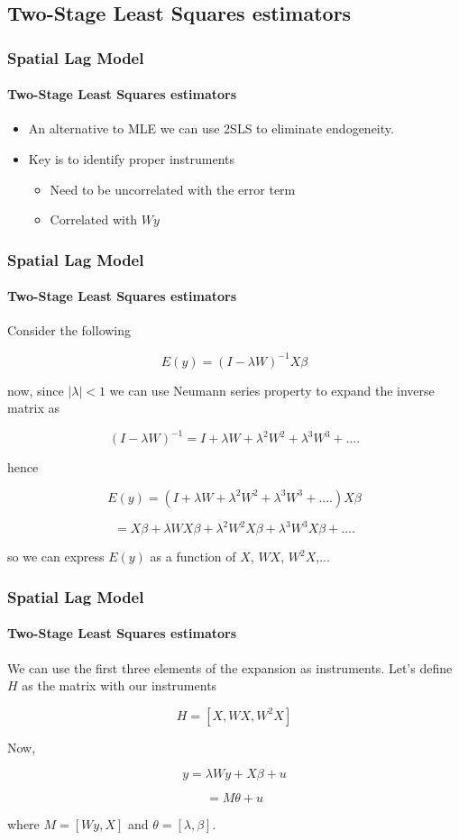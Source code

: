 \documentclass[
  shownotes,
  xcolor={svgnames},
  hyperref={colorlinks,citecolor=DarkBlue,linkcolor=DarkRed,urlcolor=DarkBlue}
  , aspectratio=169]{beamer}
\begin{document}
\subsection{Two-Stage Least Squares estimators}
\begin{frame}[fragile]
\frametitle{Spatial Lag Model}
\framesubtitle{Two-Stage Least Squares estimators}

\begin{itemize}
\item An alternative to MLE we can use 2SLS to eliminate endogeneity.
\bigskip
\item Key is to identify proper instruments
\bigskip
\begin{itemize}
\item Need to be uncorrelated with the error term
\bigskip
\item Correlated with $Wy$
\end{itemize}
\end{itemize}

\end{frame}
\begin{frame}[fragile]
\frametitle{Spatial Lag Model}
\framesubtitle{Two-Stage Least Squares estimators}
Consider the following

\[
E(y)=(I-\lambda W)^{-1}X\beta
\]

now, since $|\lambda|<1$ we can use Neumann series property to expand
the inverse matrix as 

\[
(I-\lambda W)^{-1}=I+\lambda W+\lambda^{2}W^{2}+\lambda^{3}W^{3}+....
\]

hence

\[
E(y)=(I+\lambda W+\lambda^{2}W^{2}+\lambda^{3}W^{3}+....)X\beta
\]

\[
=X\beta+\lambda WX\beta+\lambda^{2}W^{2}X\beta+\lambda^{3}W^{3}X\beta+....
\]

so we can express $E(y)$ as a function of $X$, $WX$, $W^{2}X$,... 


\end{frame}
\begin{frame}[fragile]
\frametitle{Spatial Lag Model}
\framesubtitle{Two-Stage Least Squares estimators}

We can use the first three elements of the expansion as instruments.
Let's define $H$ as the matrix with our instruments 

\[
H=[X,WX,W^{2}X]
\]

Now, 

\[
y=\lambda Wy+X\beta+u
\]

\[
=M\theta+u
\]

\medskip
where $M=[Wy,X]$ and $\theta=[\lambda,\beta]$. 

\end{frame}
\end{document}
